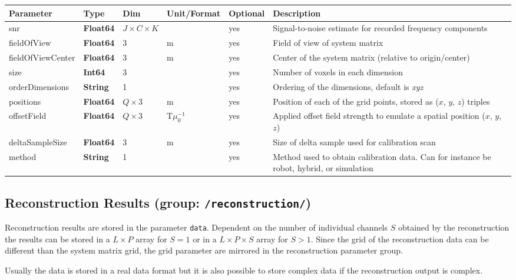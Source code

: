 \documentclass[landscape,a4paper]{article} %
\newcommand{\inl}[1]{\lstinline[columns=fixed]{#1}}
\newcommand{\inltab}[1]{{\ttfamily\bfseries\color{blue}#1}}
\newcommand{\inlvar}[1]{{\ttfamily#1}}
\begin{document}
\noindent \begin{tabularx}{\columnwidth}{llp{3cm}llX} 
\textbf{Parameter} & \textbf{Type} & \textbf{Dim} & \textbf{Unit/Format} & \textbf{Optional} & \textbf{Description} \\ \hline 
\inlvar{snr} & \inltab{Float64} & $J \times C \times K$ &  & yes & Signal-to-noise estimate for recorded frequency components \\ \hline
\inlvar{fieldOfView} & \inltab{Float64} & $3$ & m & yes & Field of view of system matrix \\ \hline
\inlvar{fieldOfViewCenter} & \inltab{Float64} & $3$ & m & yes & Center of the system matrix (relative to origin/center) \\ \hline
\inlvar{size} & \inltab{Int64} & $3$ &  & yes & Number of voxels in each dimension \\ \hline
\inlvar{orderDimensions} & \inltab{String} & 1 & & yes & Ordering of the dimensions, default is \textit{xyz} \\ \hline
\inlvar{positions} & \inltab{Float64} & $Q \times 3$ & m & yes & Position of each of the grid points, stored as ($x$, $y$, $z$) triples \\ \hline
\inlvar{offsetField} & \inltab{Float64} & $Q \times 3$ & T$\mu_0^{-1}$ & yes & Applied offset field strength to emulate a spatial position ($x$, $y$, $z$) \\ \hline
\inlvar{deltaSampleSize} & \inltab{Float64} & 3 & m & yes & Size of delta sample used for calibration scan \\ \hline
\inlvar{method} & \inltab{String} & 1 & & yes & Method used to obtain calibration data. Can for instance be robot, hybrid, or simulation \\ \hline
\end{tabularx}


\subsection{Reconstruction Results (group: \inl{/reconstruction/})}

\begin{multicols}{2}
Reconstruction results are stored in the parameter \inl{data}. Dependent on the number of individual channels $S$ obtained by the reconstruction the results can be stored in a $L\times P$ array for $S=1$ or in a $L\times P \times S$ array for $S>1$. Since the grid of the reconstruction data can be different than the system matrix grid, the grid parameter are mirrored in the reconstruction parameter group. 

Usually the data is stored in a real data format but it is also possible to store complex data if the reconstruction output is complex.
\end{multicols}
\end{document}
